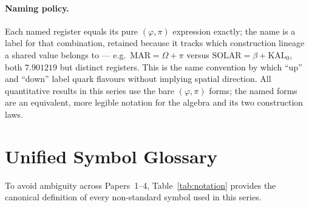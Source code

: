 \documentclass[12pt,a4paper]{article}
\begin{document}
\paragraph{Naming policy.}
Each named register equals its pure $(\varphi,\pi)$ expression exactly; the name
is a label for that combination, retained because it tracks which construction
lineage a shared value belongs to --- e.g.\ $\mathrm{MAR}=\Omega+\pi$ versus
$\mathrm{SOLAR}=\beta+\mathrm{KAL}_0$, both $7.901219$ but distinct registers.
This is the same convention by which ``up'' and ``down'' label quark flavours
without implying spatial direction. All quantitative results in this series use
the bare $(\varphi,\pi)$ forms; the named forms are an equivalent, more legible
notation for the algebra and its two construction laws.

\section{Unified Symbol Glossary}
\label{app:notation}

To avoid ambiguity across Papers~1--4, Table~\ref{tab:notation}
provides the canonical definition of every non-standard symbol used
in this series.
\end{document}
